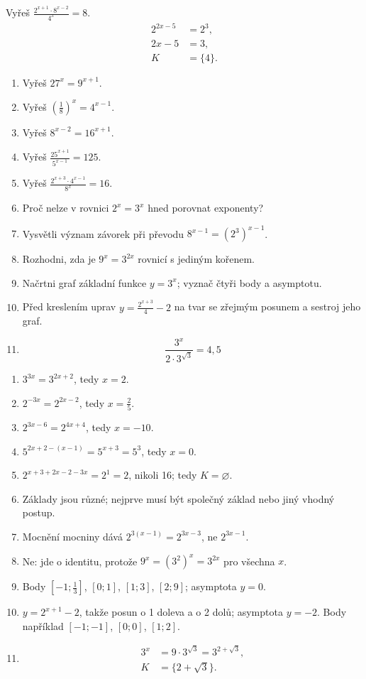 \documentclass[11pt,a4paper]{article}
\begin{document}
\begin{zadaniReseniBox}[title={Rozšíření 1}]
Vyřeš $\frac{2^{x+1}\cdot8^{x-2}}{4^x}=8$.
\tcblower\[\begin{aligned}2^{2x-5}&=2^3,\\2x-5&=3,\\K&=\{4\}.\end{aligned}\]
\end{zadaniReseniBox}
\clearpage
\begin{zadaniReseniBox}[title={Domácí úkol}]
\begin{enumerate}[label=\alph*)]
\item Vyřeš $27^x=9^{x+1}$.
\item Vyřeš $\left(\frac{1}{8}\right)^x=4^{x-1}$.
\item Vyřeš $8^{x-2}=16^{x+1}$.
\item Vyřeš $\frac{25^{x+1}}{5^{x-1}}=125$.
\item Vyřeš $\frac{2^{x+3}\cdot4^{x-1}}{8^x}=16$.
\item Proč nelze v rovnici $2^x=3^x$ hned porovnat exponenty?
\item Vysvětli význam závorek při převodu $8^{x-1}=(2^3)^{x-1}$.
\item Rozhodni, zda je $9^x=3^{2x}$ rovnicí s jediným kořenem.
\item Načrtni graf základní funkce $y=3^x$; vyznač čtyři body a asymptotu.
\item Před kreslením uprav $y=\frac{2^{x+3}}4-2$ na tvar se zřejmým posunem a sestroj jeho graf.
\item \[ \frac{3^x}{2\cdot3^{\sqrt3}}=4{,}5 \]
\end{enumerate}
\tcblower
\begin{enumerate}[label=\alph*)]
\item $3^{3x}=3^{2x+2}$, tedy $x=2$.
\item $2^{-3x}=2^{2x-2}$, tedy $x=\frac{2}{5}$.
\item $2^{3x-6}=2^{4x+4}$, tedy $x=-10$.
\item $5^{2x+2-(x-1)}=5^{x+3}=5^3$, tedy $x=0$.
\item $2^{x+3+2x-2-3x}=2^1=2$, nikoli 16; tedy $K=\varnothing$.
\item Základy jsou různé; nejprve musí být společný základ nebo jiný vhodný postup.
\item Mocnění mocniny dává $2^{3(x-1)}=2^{3x-3}$, ne $2^{3x-1}$.
\item Ne: jde o identitu, protože $9^x=(3^2)^x=3^{2x}$ pro všechna $x$.
\item Body $[-1;\frac{1}{3}]$, $[0;1]$, $[1;3]$, $[2;9]$; asymptota $y=0$.
\item $y=2^{x+1}-2$, takže posun o 1 doleva a o 2 dolů; asymptota $y=-2$. Body například $[-1;-1]$, $[0;0]$, $[1;2]$.
\item \[\begin{aligned}3^x&=9\cdot3^{\sqrt3}=3^{2+\sqrt3},\\K&=\{2+\sqrt3\}.\end{aligned}\]
\end{enumerate}
\end{zadaniReseniBox}
\end{document}
